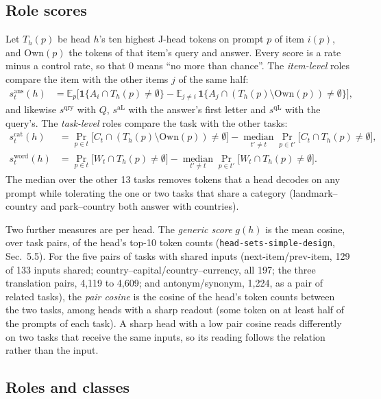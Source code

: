 \documentclass[10pt,a4paper]{article}
\newcommand{\simpledoc}{\texttt{head-sets-simple-design}}
\begin{document}
\subsection{Role scores}\label{sec:scores}

Let $T_h(p)$ be head $h$'s ten highest J-head tokens on prompt $p$ of item $i(p)$, and $\mathrm{Own}(p)$ the tokens of that item's query and answer. Every score is a rate minus a control rate, so that 0 means ``no more than chance''. The \emph{item-level} roles compare the item with the other items $j$ of the same half:
\begin{align}
s^{\mathrm{ans}}_t(h) &= \mathbb{E}_p\Big[\mathbf{1}\{A_{i}\cap T_h(p)\neq\emptyset\} - \mathbb{E}_{j\neq i}\,\mathbf{1}\{A_j\cap (T_h(p)\setminus \mathrm{Own}(p))\neq\emptyset\}\Big],
\end{align}
and likewise $s^{\mathrm{qry}}$ with $Q$, $s^{\mathrm{aL}}$ with the answer's first letter and $s^{\mathrm{qL}}$ with the query's. The \emph{task-level} roles compare the task with the other tasks:
\begin{align}
s^{\mathrm{cat}}_t(h) &= \Pr_{p\in t}\big[C_t\cap (T_h(p)\setminus\mathrm{Own}(p))\neq\emptyset\big] - \operatorname*{median}_{t'\neq t}\Pr_{p\in t'}\big[C_t\cap T_h(p)\neq\emptyset\big],\\
s^{\mathrm{word}}_t(h) &= \Pr_{p\in t}\big[W_t\cap T_h(p)\neq\emptyset\big] - \operatorname*{median}_{t'\neq t}\Pr_{p\in t'}\big[W_t\cap T_h(p)\neq\emptyset\big].
\end{align}
The median over the other 13 tasks removes tokens that a head decodes on any prompt while tolerating the one or two tasks that share a category (landmark--country and park--country both answer with countries).

Two further measures are per head. The \emph{generic score} $g(h)$ is the mean cosine, over task pairs, of the head's top-10 token counts (\simpledoc, Sec.~5.5). For the five pairs of tasks with shared inputs (next-item/prev-item, 129 of 133 inputs shared; country--capital/country--currency, all 197; the three translation pairs, 4{,}119 to 4{,}609; and antonym/synonym, 1{,}224, as a pair of related tasks), the \emph{pair cosine} is the cosine of the head's token counts between the two tasks, among heads with a sharp readout (some token on at least half of the prompts of each task). A sharp head with a low pair cosine reads differently on two tasks that receive the same inputs, so its reading follows the relation rather than the input.

\subsection{Roles and classes}\label{sec:classes}
\end{document}
